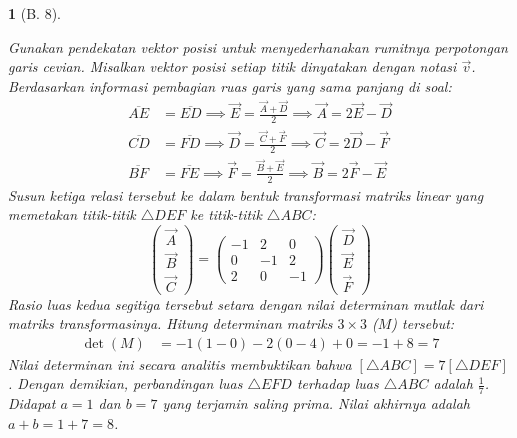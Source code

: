 \documentclass[11pt,a4paper,DIV=12]{scrartcl}
\theoremstyle{problemstyle}
\theoremstyle{answerstyle}
\newtheorem{answer}{}
\begin{document}
\begin{answer}[B. 8]
\begin{center}
  \end{center}
  Gunakan pendekatan vektor posisi untuk menyederhanakan rumitnya perpotongan garis cevian. Misalkan vektor posisi setiap titik dinyatakan dengan notasi $\vec{v}$.
  Berdasarkan informasi pembagian ruas garis yang sama panjang di soal:
  $$ \begin{aligned} \overline{AE} &= \overline{ED} \implies \vec{E} = \frac{\vec{A} + \vec{D}}{2} \implies \vec{A} = 2\vec{E} - \vec{D} \\ \overline{CD} &= \overline{FD} \implies \vec{D} = \frac{\vec{C} + \vec{F}}{2} \implies \vec{C} = 2\vec{D} - \vec{F} \\ \overline{BF} &= \overline{FE} \implies \vec{F} = \frac{\vec{B} + \vec{E}}{2} \implies \vec{B} = 2\vec{F} - \vec{E} \end{aligned} $$
  Susun ketiga relasi tersebut ke dalam bentuk transformasi matriks linear yang memetakan titik-titik $\triangle DEF$ ke titik-titik $\triangle ABC$:
  $$ \begin{pmatrix} \vec{A} \\ \vec{B} \\ \vec{C} \end{pmatrix} = \begin{pmatrix} -1 & 2 & 0 \\ 0 & -1 & 2 \\ 2 & 0 & -1 \end{pmatrix} \begin{pmatrix} \vec{D} \\ \vec{E} \\ \vec{F} \end{pmatrix} $$
  Rasio luas kedua segitiga tersebut setara dengan nilai determinan mutlak dari matriks transformasinya. Hitung determinan matriks $3 \times 3$ ($M$) tersebut:
  $$ \begin{aligned} \det(M) &= -1(1 - 0) - 2(0 - 4) + 0 = -1 + 8 = 7 \end{aligned} $$
  Nilai determinan ini secara analitis membuktikan bahwa $[\triangle ABC] = 7 [\triangle DEF]$.
  Dengan demikian, perbandingan luas $\triangle EFD$ terhadap luas $\triangle ABC$ adalah $\frac{1}{7}$.
  Didapat $a=1$ dan $b=7$ yang terjamin saling prima.
  Nilai akhirnya adalah $a+b = 1+7 = \boxed{8}$.
\end{answer}
\end{document}
